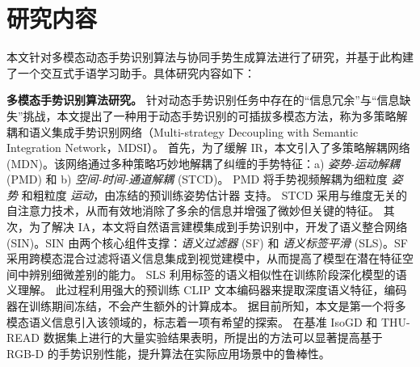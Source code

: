 

\section{研究内容}

本文针对多模态动态手势识别算法与协同手势生成算法进行了研究，并基于此构建了一个交互式手语学习助手。具体研究内容如下：


\textbf{多模态手势识别算法研究。} 针对动态手势识别任务中存在的“信息冗余”与“信息缺失”挑战，本文提出了一种用于动态手势识别的可插拔多模态方法，称为多策略解耦和语义集成手势识别网络（Multi-strategy Decoupling with Semantic Integration Network，MDSI）。
首先，为了缓解 IR，本文引入了多策略解耦网络 (MDN)。该网络通过多种策略巧妙地解耦了纠缠的手势特征：a) \emph{姿势-运动解耦} (PMD) 和 b) \emph{空间-时间-通道解耦} (STCD)。
PMD 将手势视频解耦为细粒度 \emph{姿势} 和粗粒度 \emph{运动}，由冻结的预训练姿势估计器 \cite{sun2019deep} 支持。
STCD 采用与维度无关的自注意力技术，从而有效地消除了多余的信息并增强了微妙但关键的特征。
其次，为了解决 IA，本文将自然语言建模集成到手势识别中，开发了语义整合网络 (SIN)。SIN 由两个核心组件支撑：\emph{语义过滤器} (SF) 和 \emph{语义标签平滑} (SLS)。SF 采用跨模态混合过滤将语义信息集成到视觉建模中，从而提高了模型在潜在特征空间中辨别细微差别的能力。
SLS 利用标签的语义相似性在训练阶段深化模型的语义理解。
此过程利用强大的预训练 CLIP 文本编码器来提取深度语义特征，编码器在训练期间冻结，不会产生额外的计算成本。
据目前所知，本文是第一个将多模态语义信息引入该领域的，标志着一项有希望的探索。
在基准 IsoGD 和 THU-READ 数据集上进行的大量实验结果表明，所提出的方法可以显著提高基于 RGB-D 的手势识别性能，提升算法在实际应用场景中的鲁棒性。


